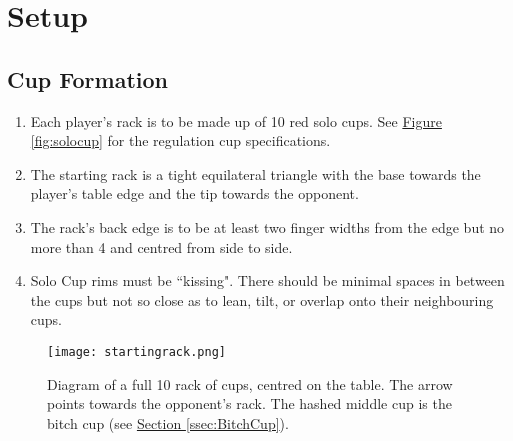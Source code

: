\section{Setup}\label{sec:SETUP}
	\subsection{Cup Formation}\label{ssec:CupFormation}
		\begin{enumerate}[label=(\roman*), ref=\roman*]
            \item \label{sssec:CF,solocups} Each player's rack is to be made up of 10 red  solo cups.
                See \hyperref[fig:solocup]{Figure \ref*{fig:solocup}} for the regulation cup specifications. 
            \item \label{sssec:CF,triangle} The starting rack is a tight equilateral triangle with the base towards the player's table edge and the tip towards the opponent. 
            \item \label{sssec:CF,position} The rack's back edge is to be at least two finger widths from the edge but no more than 4 and centred from side to side. 
            \item \label{sssec:CF,kissing} Solo Cup rims must be ``kissing". There should be minimal spaces in between the cups but not so close as to lean, tilt, or overlap onto their neighbouring cups. 
        \end{enumerate}
        \begin{figure}[H]%
            \centering
            \texttt{[image: startingrack.png]}
            \caption{Diagram of a full 10 rack of cups, centred on the table. The arrow points towards the opponent's rack. The hashed middle cup is the bitch cup (see \hyperref[ssec:BitchCup]{Section \ref*{ssec:BitchCup}}).}
            \label{fig:therack}
        \end{figure}
